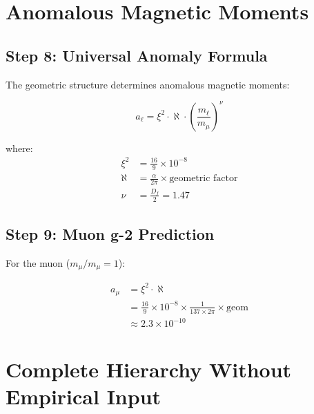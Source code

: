 \documentclass[12pt,a4paper]{article}
\newcommand{\xipar}{\xi}  %
\begin{document}
	\section{Anomalous Magnetic Moments}
	
	\subsection{Step 8: Universal Anomaly Formula}
	
	The geometric structure determines anomalous magnetic moments:
	
	\begin{equation}
		a_\ell = \xipar^2 \cdot \aleph \cdot \left(\frac{m_\ell}{m_\mu}\right)^\nu
	\end{equation}
	
	where:
	\begin{align}
		\xipar^2 &= \frac{16}{9} \times 10^{-8} \\
		\aleph &= \frac{\alpha}{2\pi} \times \text{geometric factor} \\
		\nu &= \frac{D_f}{2} = 1.47
	\end{align}
	
	\subsection{Step 9: Muon g-2 Prediction}
	
	For the muon ($m_\mu/m_\mu = 1$):
	
	\begin{keyresult}
		\begin{align}
			a_\mu &= \xipar^2 \cdot \aleph \\
			&= \frac{16}{9} \times 10^{-8} \times \frac{1}{137 \times 2\pi} \times \text{geom} \\
			&\approx 2.3 \times 10^{-10}
		\end{align}
	\end{keyresult}
	
	\section{Complete Hierarchy Without Empirical Input}
	
\end{document}
